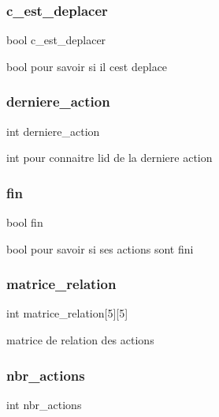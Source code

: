 \subsubsection{\texorpdfstring{c\_est\_deplacer}{c\_est\_deplacer}}
{\footnotesize\ttfamily bool c\+\_\+est\+\_\+deplacer}

bool pour savoir si il c\textquotesingle{}est deplace \mbox{\label{structetudiant_aed4f7574081acaa56f53d62c3f102c18}} 
\subsubsection{\texorpdfstring{derniere\_action}{derniere\_action}}
{\footnotesize\ttfamily int derniere\+\_\+action}

int pour connaitre l\textquotesingle{}id de la derniere action \mbox{\label{structetudiant_a0b113aac112ac144399879c086aac230}} 
\subsubsection{\texorpdfstring{fin}{fin}}
{\footnotesize\ttfamily bool fin}

bool pour savoir si ses actions sont fini \mbox{\label{structetudiant_acdc27985d3240acfcd769d2c2ae3a0bb}} 
\subsubsection{\texorpdfstring{matrice\_relation}{matrice\_relation}}
{\footnotesize\ttfamily int matrice\+\_\+relation\mbox{[}5\mbox{]}\mbox{[}5\mbox{]}}

matrice de relation des actions \mbox{\label{structetudiant_ad778ea2854803a23bf94e8370999e5ed}} 
\subsubsection{\texorpdfstring{nbr\_actions}{nbr\_actions}}
{\footnotesize\ttfamily int nbr\+\_\+actions}

